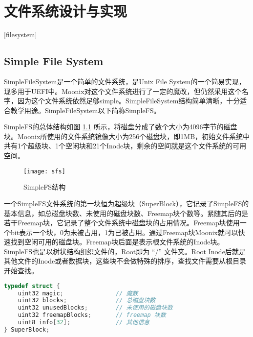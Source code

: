 
\chapter{文件系统设计与实现}[filesystem]
\label{chapter:filesystem}

\section{Simple File System}

SimpleFileSystem是一个简单的文件系统，是Unix File System\cite{ufs}\cite{DBLP:conf/amast/Heisel95}的一个简易实现，现多用于UEFI中。Moonix对这个文件系统进行了一定的魔改，但仍然采用这个名字，因为这个文件系统依然足够simple。SimpleFileSystem结构简单清晰，十分适合教学用途。SimpleFileSystem以下简称SimpleFS。

SimpleFS的总体结构如图 \ref{pic:sfs} 所示，将磁盘分成了数个大小为4096字节的磁盘块。Moonix所使用的文件系统镜像大小为256个磁盘块，即1MB，初始文件系统中共有1个超级块、1个空闲块和21个Inode块，剩余的空间就是这个文件系统的可用空间。

\begin{figure}[htpb]
	\centering
	\texttt{[image: sfs]}
	\setlength{\abovecaptionskip}{2pt}
	\caption{SimpleFS结构}
	\label{pic:sfs}
\end{figure}

一个SimpleFS文件系统的第一块恒为超级块（SuperBlock），它记录了SimpleFS的基本信息，如总磁盘块数、未使用的磁盘块数、Freemap块个数等。紧随其后的是若干Freemap块，它记录了整个文件系统中磁盘块的占用情况。Freemap块使用一个bit表示一个块，0为未被占用，1为已被占用。通过Freemap块Moonix就可以快速找到空闲可用的磁盘块。Freemap块后面是表示根文件系统的Inode块。SimpleFS也是以树状结构组织文件的，Root即为 “/” 文件夹。Root Inode后就是其他文件的Inode或者数据块，这些块不会做特殊的排序，查找文件需要从根目录开始查找。

\begin{minipage}[c]{0.95\textwidth}
\begin{lstlisting}[language={C}, caption={SimpleFS超级块结构}, label={lst:superblock}]
typedef struct {
	uint32 magic;               // 魔数
	uint32 blocks;              // 总磁盘块数
	uint32 unusedBlocks;        // 未使用的磁盘块数
	uint32 freemapBlocks;       // freemap 块数
	uint8 info[32];             // 其他信息
} SuperBlock;
\end{lstlisting}
\end{minipage}

